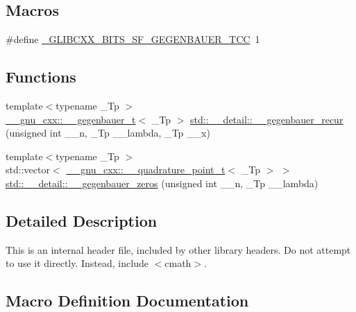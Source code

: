 \subsection*{Macros}
\begin{DoxyCompactItemize}
\item 
\#define \hyperlink{sf__gegenbauer_8tcc_a852487dbb4d1ae46436391df0454ef59}{\+\_\+\+G\+L\+I\+B\+C\+X\+X\+\_\+\+B\+I\+T\+S\+\_\+\+S\+F\+\_\+\+G\+E\+G\+E\+N\+B\+A\+U\+E\+R\+\_\+\+T\+CC}~1
\end{DoxyCompactItemize}
\subsection*{Functions}
\begin{DoxyCompactItemize}
\item 
{\footnotesize template$<$typename \+\_\+\+Tp $>$ }\\\hyperlink{struct____gnu__cxx_1_1____gegenbauer__t}{\+\_\+\+\_\+gnu\+\_\+cxx\+::\+\_\+\+\_\+gegenbauer\+\_\+t}$<$ \+\_\+\+Tp $>$ \hyperlink{namespacestd_1_1____detail_a34e6b1cce7eca17d0929284577124747}{std\+::\+\_\+\+\_\+detail\+::\+\_\+\+\_\+gegenbauer\+\_\+recur} (unsigned int \+\_\+\+\_\+n, \+\_\+\+Tp \+\_\+\+\_\+lambda, \+\_\+\+Tp \+\_\+\+\_\+x)
\item 
{\footnotesize template$<$typename \+\_\+\+Tp $>$ }\\std\+::vector$<$ \hyperlink{struct____gnu__cxx_1_1____quadrature__point__t}{\+\_\+\+\_\+gnu\+\_\+cxx\+::\+\_\+\+\_\+quadrature\+\_\+point\+\_\+t}$<$ \+\_\+\+Tp $>$ $>$ \hyperlink{namespacestd_1_1____detail_ae009135e8f2dfd9e97694c778a15ce08}{std\+::\+\_\+\+\_\+detail\+::\+\_\+\+\_\+gegenbauer\+\_\+zeros} (unsigned int \+\_\+\+\_\+n, \+\_\+\+Tp \+\_\+\+\_\+lambda)
\end{DoxyCompactItemize}


\subsection{Detailed Description}
This is an internal header file, included by other library headers. Do not attempt to use it directly. Instead, include $<$cmath$>$. 

\subsection{Macro Definition Documentation}
\mbox{\label{sf__gegenbauer_8tcc_a852487dbb4d1ae46436391df0454ef59}} 
